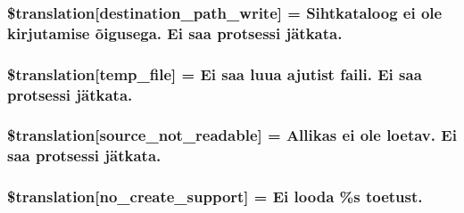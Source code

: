 \subsubsection[{\$translation}]{\setlength{\rightskip}{0pt plus 5cm}\$translation\mbox{[}\textquotesingle{}destination\+\_\+path\+\_\+write\textquotesingle{}\mbox{]} = \textquotesingle{}Sihtkataloog ei ole kirjutamise õigusega. Ei saa protsessi jätkata.\textquotesingle{}}\label{class_8upload_8et___e_e_8php_a40e4e1962226b89fd76da5819a9602b0}
\hypertarget{class_8upload_8et___e_e_8php_a2baece8da11e20d45175db91851ec3e3}{}
\subsubsection[{\$translation}]{\setlength{\rightskip}{0pt plus 5cm}\$translation\mbox{[}\textquotesingle{}temp\+\_\+file\textquotesingle{}\mbox{]} = \textquotesingle{}Ei saa luua ajutist faili. Ei saa protsessi jätkata.\textquotesingle{}}\label{class_8upload_8et___e_e_8php_a2baece8da11e20d45175db91851ec3e3}
\hypertarget{class_8upload_8et___e_e_8php_a922967ca2df0efdd455261142d8e5715}{}
\subsubsection[{\$translation}]{\setlength{\rightskip}{0pt plus 5cm}\$translation\mbox{[}\textquotesingle{}source\+\_\+not\+\_\+readable\textquotesingle{}\mbox{]} = \textquotesingle{}Allikas ei ole loetav. Ei saa protsessi jätkata.\textquotesingle{}}\label{class_8upload_8et___e_e_8php_a922967ca2df0efdd455261142d8e5715}
\hypertarget{class_8upload_8et___e_e_8php_a346dfd1ade29f583dd20d345c436859f}{}
\subsubsection[{\$translation}]{\setlength{\rightskip}{0pt plus 5cm}\$translation\mbox{[}\textquotesingle{}no\+\_\+create\+\_\+support\textquotesingle{}\mbox{]} = \textquotesingle{}Ei looda \%s toetust.\textquotesingle{}}\label{class_8upload_8et___e_e_8php_a346dfd1ade29f583dd20d345c436859f}
\hypertarget{class_8upload_8et___e_e_8php_a53013ce9255c4e1849098ddd9fdb2b3f}{}
